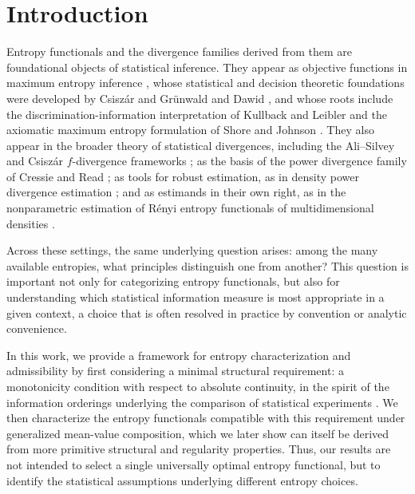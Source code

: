 \documentclass[reqno]{amsart}
\begin{document}

\maketitle


\section{Introduction}

Entropy functionals and the divergence families derived from them are foundational objects of statistical inference. They appear as objective functions in maximum entropy inference \cite{Jay57}, whose statistical and decision theoretic foundations were developed by Csisz\'ar \cite{Csi91} and Grünwald and Dawid \cite{GrunDaw04}, and whose roots include the
discrimination-information interpretation of Kullback and Leibler \cite{KulLeib51} and the axiomatic maximum entropy formulation of Shore and Johnson \cite{ShoJoh80}. They also appear in the broader theory of statistical divergences, including the Ali--Silvey and Csiszár $f$-divergence frameworks \cite{AliSilvey66,Csiszar67}; as the basis of the power divergence family of Cressie and Read \cite{CresRead84}; as tools for robust estimation, as in density power divergence estimation \cite{BasuHarr98}; and as estimands in their own right, as in the nonparametric estimation of Rényi entropy functionals of multidimensional densities \cite{Leo08}.


Across these settings, the same underlying question arises: among the many available entropies, what principles distinguish one from another? This question is important not only for categorizing entropy functionals, but also for understanding which statistical information measure is most appropriate in a given context, a choice that is often resolved in practice by convention or analytic convenience.


In this work, we provide a framework for entropy characterization and admissibility by first considering a minimal structural requirement: a monotonicity condition with respect to
absolute continuity, in the spirit of the information orderings underlying the comparison of statistical experiments \cite{Blackwell53, LeCam64}. 
We then characterize the entropy functionals compatible with this requirement under generalized mean-value composition, which we later show can itself be derived from more primitive structural and regularity properties. 
Thus, our results are not intended to select a single universally optimal entropy functional, but to identify the statistical assumptions underlying different entropy choices.
\end{document}
